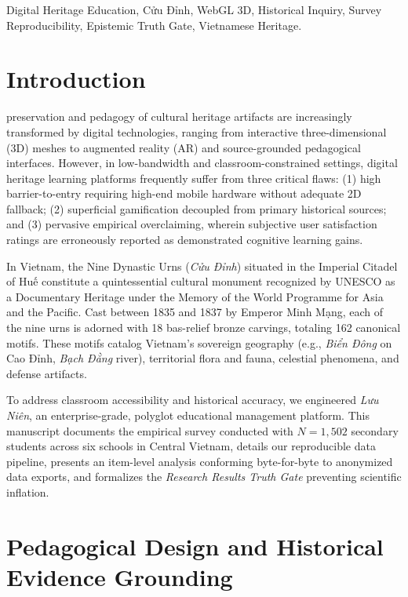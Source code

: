 \documentclass[journal]{IEEEtran}
\begin{document}
\begin{IEEEkeywords}
Digital Heritage Education, Cửu Đỉnh, WebGL 3D, Historical Inquiry, Survey Reproducibility, Epistemic Truth Gate, Vietnamese Heritage.
\end{IEEEkeywords}

\section{Introduction}
 preservation and pedagogy of cultural heritage artifacts are increasingly transformed by digital technologies, ranging from interactive three-dimensional (3D) meshes to augmented reality (AR) and source-grounded pedagogical interfaces. However, in low-bandwidth and classroom-constrained settings, digital heritage learning platforms frequently suffer from three critical flaws: (1) high barrier-to-entry requiring high-end mobile hardware without adequate 2D fallback; (2) superficial gamification decoupled from primary historical sources; and (3) pervasive empirical overclaiming, wherein subjective user satisfaction ratings are erroneously reported as demonstrated cognitive learning gains.

In Vietnam, the Nine Dynastic Urns (\textit{Cửu Đỉnh}) situated in the Imperial Citadel of Huế constitute a quintessential cultural monument recognized by UNESCO as a Documentary Heritage under the Memory of the World Programme for Asia and the Pacific. Cast between 1835 and 1837 by Emperor Minh Mạng, each of the nine urns is adorned with 18 bas-relief bronze carvings, totaling 162 canonical motifs. These motifs catalog Vietnam's sovereign geography (e.g., \textit{Biển Đông} on Cao Đỉnh, \textit{Bạch Đằng} river), territorial flora and fauna, celestial phenomena, and defense artifacts.

To address classroom accessibility and historical accuracy, we engineered \textit{Lưu Niên}, an enterprise-grade, polyglot educational management platform. This manuscript documents the empirical survey conducted with $N = 1,502$ secondary students across six schools in Central Vietnam, details our reproducible data pipeline, presents an item-level analysis conforming byte-for-byte to anonymized data exports, and formalizes the \textit{Research Results Truth Gate} preventing scientific inflation.

\section{Pedagogical Design and Historical Evidence Grounding}
\end{document}
